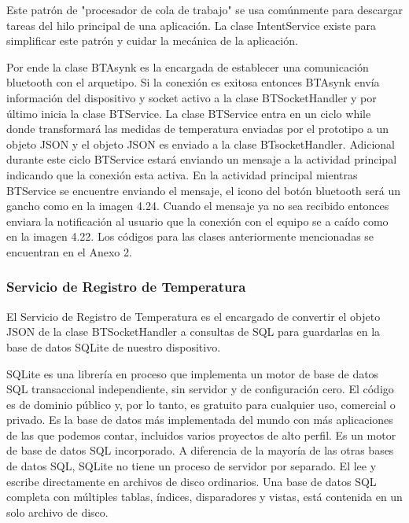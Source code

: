 \par \noindent
Este patrón de "procesador de cola de trabajo" se usa comúnmente para descargar tareas del hilo principal de una aplicación. La clase IntentService existe para simplificar este patrón y cuidar la mecánica de la aplicación. \cite{intentservice}

\par \noindent
Por ende la clase BTAsynk es la encargada de establecer una comunicación bluetooth con el arquetipo. Si la conexión es exitosa entonces BTAsynk envía información del dispositivo y socket activo a la clase BTSocketHandler y por último inicia la clase BTService. La clase BTService entra en un ciclo while donde transformará las medidas de temperatura enviadas por el prototipo a un objeto JSON y el objeto JSON es enviado a la clase BTsocketHandler. Adicional durante este ciclo BTService estará enviando un mensaje a la actividad principal indicando que la conexión esta activa. En la actividad principal mientras BTService se encuentre enviando el mensaje, el icono del botón bluetooth será un gancho como en la imagen 4.24. Cuando el mensaje ya no sea recibido entonces enviara la notificación al usuario que la conexión con el equipo se a caído como en la imagen 4.22. Los códigos para las clases anteriormente mencionadas se encuentran en el Anexo 2.

\subsubsection{Servicio de Registro de Temperatura}

\par 
El Servicio de Registro de Temperatura es el encargado de convertir el objeto JSON de la clase BTSocketHandler a consultas de SQL para guardarlas en la base de datos SQLite de nuestro dispositivo.

\par \noindent
SQLite es una librería en proceso que implementa un motor de base de datos SQL transaccional independiente, sin servidor y de configuración cero. El código es de dominio público y, por lo tanto, es gratuito para cualquier uso, comercial o privado. Es la base de datos más implementada del mundo con más aplicaciones de las que podemos contar, incluidos varios proyectos de alto perfil. Es un motor de base de datos SQL incorporado. A diferencia de la mayoría de las otras bases de datos SQL, SQLite no tiene un proceso de servidor por separado. El lee y escribe directamente en archivos de disco ordinarios. Una base de datos SQL completa con múltiples tablas, índices, disparadores y vistas, está contenida en un solo archivo de disco.\cite{sqlite}

